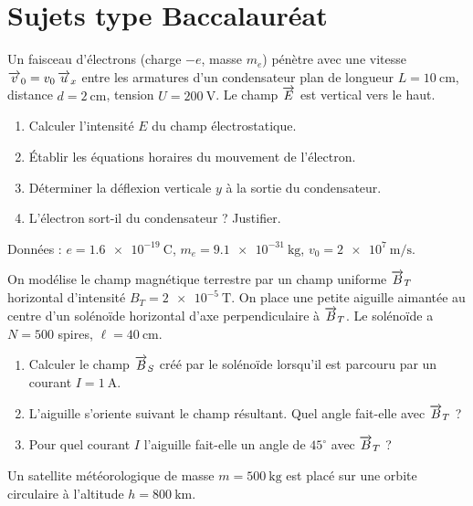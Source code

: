 \section{Sujets type Baccalauréat}


Un faisceau d’électrons (charge $-e$, masse $m_e$) pénètre avec une vitesse $\overrightarrow{v}_0 = v_0\,\overrightarrow{u}_x$ entre les armatures d’un condensateur plan de longueur $L = \SI{10}{\centi\metre}$, distance $d = \SI{2}{\centi\metre}$, tension $U = \SI{200}{\volt}$. Le champ $\overrightarrow{E}$ est vertical vers le haut.

\begin{enumerate}[label=\arabic*)]
\item Calculer l’intensité $E$ du champ électrostatique.
\item Établir les équations horaires du mouvement de l’électron.
\item Déterminer la déflexion verticale $y$ à la sortie du condensateur.
\item L’électron sort-il du condensateur ? Justifier.
\end{enumerate}

Données : $e = \SI{1.6e-19}{\coulomb}$, $m_e = \SI{9.1e-31}{\kilogram}$, $v_0 = \SI{2e7}{\metre\per\second}$.


On modélise le champ magnétique terrestre par un champ uniforme $\overrightarrow{B}_T$ horizontal d’intensité $B_T = \SI{2e-5}{\tesla}$. On place une petite aiguille aimantée au centre d’un solénoïde horizontal d’axe perpendiculaire à $\overrightarrow{B}_T$. Le solénoïde a $N = 500$ spires, $\ell = \SI{40}{\centi\metre}$.

\begin{enumerate}[label=\arabic*)]
\item Calculer le champ $\overrightarrow{B}_S$ créé par le solénoïde lorsqu’il est parcouru par un courant $I = \SI{1}{\ampere}$.
\item L’aiguille s’oriente suivant le champ résultant. Quel angle fait-elle avec $\overrightarrow{B}_T$ ?
\item Pour quel courant $I$ l’aiguille fait-elle un angle de $45^\circ$ avec $\overrightarrow{B}_T$ ?
\end{enumerate}


Un satellite météorologique de masse $m = \SI{500}{\kilogram}$ est placé sur une orbite circulaire à l’altitude $h = \SI{800}{\kilo\metre}$.


